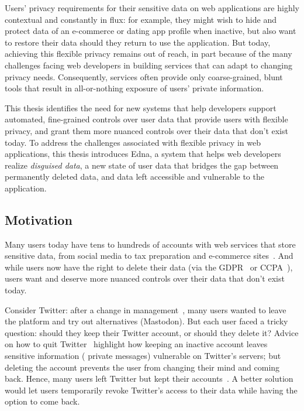 Users' privacy requirements for their sensitive data on web applications are
highly contextual and constantly in flux: for example, they might wish to hide
and protect data of an e-commerce or dating app profile when inactive, but also
want to restore their data should they return to use the application. 
%
But today, achieving this flexible privacy remains out of reach, in part because
of the many challenges facing web developers
in building services that can adapt to changing privacy
needs. Consequently, services often provide only coarse-grained, blunt tools that
result in all-or-nothing exposure of users’ private information.
%

%
This thesis identifies the need for new systems that help developers support
automated, fine-grained controls over user data that provide users with flexible
privacy, and grant them more nuanced controls over their data that don't exist
today.
%
To address the challenges associated with flexible privacy in web applications,
this thesis introduces Edna, a system that helps web developers realize
\emph{disguised data}, a new state of user data that bridges the gap between
permanently deleted data, and data left accessible and vulnerable to the
application.

\subsection{Motivation} 
Many users today have tens to hundreds of accounts with web
services that store sensitive data, from social media to tax preparation and
e-commerce sites~\cite{tens,hundreds,password_life_cycle}.
%
And while users now have the right to delete their data (via \eg the
GDPR~\cite{eu:gdpr} or CCPA~\cite{ccpa}), users want and deserve more nuanced
controls over their data that don't exist today.
%

Consider Twitter: after a change in management~\cite{musk-twitter}, many users
wanted to leave the platform and try out alternatives (\eg Mastodon).  But each
user faced a tricky question: should they keep their Twitter account, or should
they delete it?
%
Advice on how to quit Twitter~\cite{quit-twitter-india, quit-twitter-mash}
highlight how keeping an inactive account leaves sensitive information (\eg
private messages) vulnerable on Twitter's servers; but deleting the account
prevents the user from changing their mind and coming back.  Hence, many users
left Twitter but kept their accounts~\cite{nbc-twitter,shondarhimes,kenolin}.
%
A better solution would let users temporarily revoke Twitter's access to their
data while having the option to come back.

